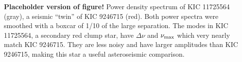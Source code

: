 \label{fig:twin}
\textbf{Placeholder version of figure!} Power density spectrum of KIC 11725564 (gray), a seismic ``twin'' of KIC 9246715 (red). Both power spectra were smoothed with a boxcar of 1/10 of the large separation. The modes in KIC 11725564, a secondary red clump star, have $\Delta \nu$ and $\nu_{\rm{max}}$ which very nearly match KIC 9246715. They are less noisy and have larger amplitudes than KIC 9246715, making this star a useful asteroseismic comparison.